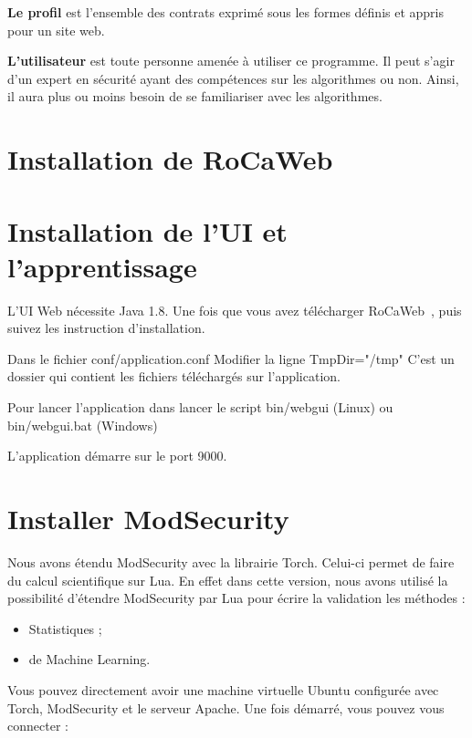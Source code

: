 \documentclass[a4paper,10pt,justified,openany]{tufte-book}
\begin{document}
\textbf{Le profil} est l'ensemble des contrats exprimé sous les formes définis et appris pour un site web.  
 
\textbf{L'utilisateur} est toute personne amenée à utiliser ce programme. Il peut s'agir d'un expert en sécurité ayant des compétences sur les algorithmes ou non. 
Ainsi, il aura plus ou moins besoin de se familiariser avec les algorithmes.


\section{Installation de RoCaWeb}


\section{Installation de l'UI et l'apprentissage}

L'UI Web nécessite Java 1.8. 
Une fois que vous avez télécharger RoCaWeb~, 
puis suivez les instruction d'installation.


Dans le fichier conf/application.conf
Modifier la ligne TmpDir="/tmp"
C'est un dossier qui contient les fichiers téléchargés sur l'application.

Pour lancer l'application dans lancer le script bin/webgui (Linux) ou bin/webgui.bat (Windows)

L'application démarre sur le port 9000. 


\section{Installer ModSecurity}
Nous avons étendu ModSecurity avec la librairie Torch. Celui-ci permet de faire du calcul scientifique sur Lua. 
En effet dans cette version, nous avons utilisé la possibilité d'étendre ModSecurity par Lua pour écrire la validation  les méthodes :
\begin{itemize}
 \item Statistiques ;
 \item de Machine Learning. 
\end{itemize}

Vous pouvez directement avoir une machine virtuelle Ubuntu configurée avec Torch, ModSecurity et le serveur Apache. 
Une fois démarré, vous pouvez vous connecter : 
\end{document}
